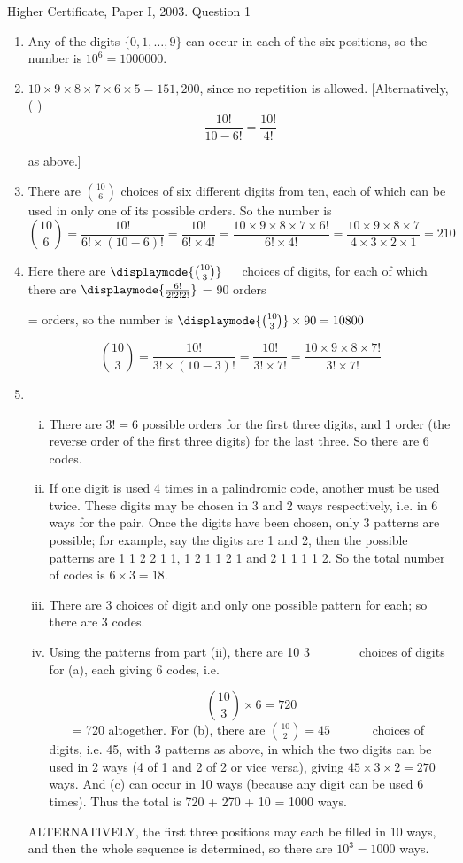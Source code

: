 \documentclass[a4paper,12pt]{article}
\begin{document}
Higher Certificate, Paper I, 2003. Question 1
\begin{enumerate}
\item Any of the digits $\{0, 1, \ldots, 9\}$ can occur in each of the six positions, so the number
is $10^6 = 1000000$.
\item $10 \times 9 \times 8 \times 7 \times 6 \times 5 = 151,200$, since no repetition is allowed.
[Alternatively, ( )
\[\frac{10!}{10- 6 !} =  \frac{10!}{4!}\] 

as above.]
\item There are ${10 \choose 6}$
choices of six different digits from ten, each of which
can be used in only one of its possible orders. So the number is
\[ {10 \choose 6} = \frac{10!}{6! \times (10-6)!} = \frac{10!}{6! \times 4!}
= \frac{10 \times 9 \times 8 \times 7 \times 6!}{6! \times 4!} = \frac{10 \times 9 \times 8 \times 7}{4 \times 3 \times 2 \times 1} = 210\]


\item  Here there are $ \displaymode{{10 \choose 3}}$
 
choices of digits, for each of which there are
$ \displaymode{\frac{6!}{2!2!2!}}$ = 90 orders

= orders, so the number is
$ \displaymode{{10 \choose 3}} \times 90 = \mbox{10800}$
 


\[ {10 \choose 3} = \frac{10!}{3! \times (10-3)!} = \frac{10!}{3! \times 7!}
= \frac{10 \times 9 \times 8 \times 7! }{3! \times 7!}\]

\item  

\begin{enumerate}[(i)]
    \item  There are $3! = 6$ possible orders for the first three digits, and 1 order
(the reverse order of the first three digits) for the last three. So there
are 6 codes.
\item If one digit is used 4 times in a palindromic code, another must be used
twice. These digits may be chosen in 3 and 2 ways respectively, i.e. in
6 ways for the pair. Once the digits have been chosen, only 3 patterns
are possible; for example, say the digits are 1 and 2, then the possible
patterns are 1 1 2 2 1 1, 1 2 1 1 2 1 and 2 1 1 1 1 2. So the total
number of codes is $6 \times 3 = 18$.
\item There are 3 choices of digit and only one possible pattern for each; so
there are 3 codes.
\item  Using the patterns from part (ii), there are
10
3
 
 
 
choices of digits for (a), each
giving 6 codes, i.e.

\[ { 10 \choose 3} \times 6 = 720\]

 
 = 720 altogether. For (b), there are
${ 10 \choose 2} = 45$ 
 
 
choices
of digits, i.e. 45, with 3 patterns as above, in which the two digits can be used
in 2 ways (4 of 1 and 2 of 2 or vice versa), giving $45 \times 3 \times 2 = 270$ ways. And
(c) can occur in 10 ways (because any digit can be used 6 times). Thus the
total is 720 + 270 + 10 = 1000 ways.
\end{enumerate}
ALTERNATIVELY, the first three positions may each be filled in 10 ways,
and then the whole sequence is determined, so there are $10^3 = 1000$ ways.
\end{enumerate}
\end{document}
